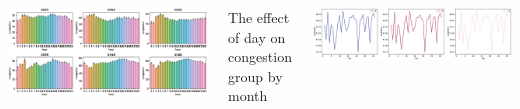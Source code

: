 \documentclass{tikzposter} %
\begin{document}
\begin{columns}
{\begin{center}
    \includegraphics{./figure/road.eps}
\end{center}
\begin{description}
  \item [The effect of day on congestion group by month ]
\end{description}
\vspace{.2cm}
\begin{center}
    \includegraphics[scale=0.8]{./figure/day.eps}
\end{center}
}



\end{columns}
\end{document}
